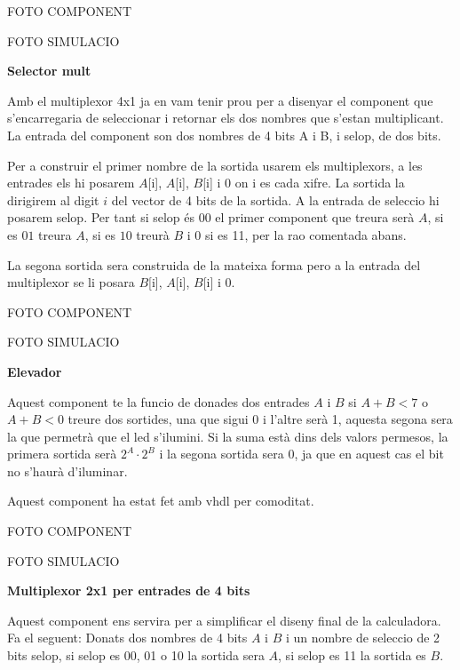 \documentclass[12pt, a4papre]{article}
\begin{document}
	\begin{center}
		FOTO COMPONENT
		
		FOTO SIMULACIO
	\end{center}
	
	\textbf{\large{Selector mult}}
	
	Amb el multiplexor 4x1 ja en vam tenir prou per a disenyar el component que s'encarregaria de seleccionar i retornar els dos nombres que s'estan multiplicant. La entrada del component son dos nombres de 4 bits A i B, i selop, de dos bits. 
	
	Per a construir el primer nombre de la sortida usarem els multiplexors, a les entrades els hi posarem $A$[i], $A$[i], $B$[i] i 0 on i es cada xifre. La sortida la dirigirem al digit $i$ del vector de 4 bits de la sortida. A la entrada de seleccio hi posarem selop. Per tant si selop és $00$ el primer component que treura serà $A$, si es $01$ treura $A$, si es $10$ treurà $B$ i 0 si es 11, per la rao comentada abans.
	
	La segona sortida sera construida de la mateixa forma pero a la entrada del multiplexor se li posara $B$[i], $A$[i], $B$[i] i 0.
	
	\begin{center}
		FOTO COMPONENT
		
		FOTO SIMULACIO
	\end{center}
	
	\textbf{\large{Elevador}}
	
	Aquest component te la funcio de donades dos entrades $A$ i $B$ si $A + B < 7$ o $A + B  < 0$ treure dos sortides, una que sigui 0 i l'altre serà 1, aquesta segona sera la que permetrà que el led s'ilumini. Si la suma està dins dels valors permesos, la primera sortida serà $2^A\cdot2^B$ i la segona sortida sera 0, ja que en aquest cas el bit no s'haurà d'iluminar.
	
	Aquest component ha estat fet amb vhdl per comoditat.
	
	\begin{center}
		FOTO COMPONENT
		
		FOTO SIMULACIO
	\end{center}
	
	\textbf{\large{Multiplexor 2x1 per entrades de 4 bits}}
	
	Aquest component ens servira per a simplificar el diseny final de la calculadora. Fa el seguent: Donats dos nombres de 4 bits $A$ i $B$ i un nombre de seleccio de 2 bits selop, si selop es 00, 01 o 10 la sortida sera $A$, si selop es 11 la sortida es $B$.
	
\end{document}
